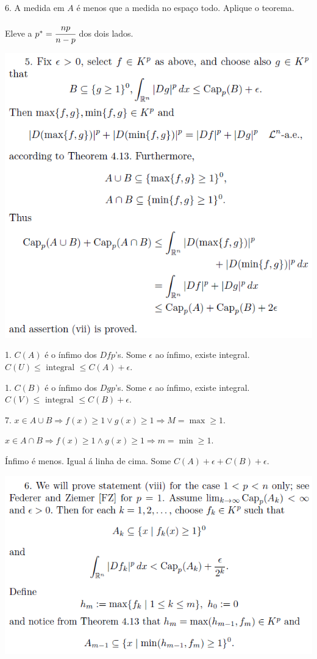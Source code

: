 \documentclass[12pt]{article}
\begin{document}
6. A medida em $A$ \'e menos que a medida no espa\c{c}o todo. Aplique o teorema.

Eleve a $p^* = \cfrac{np}{n - p}$ dos dois lados.

\vspace{300mm}

		\begin{center}
		\includegraphics[scale=.9]{13}
		\end{center}

1. $C(A)$ \'e o \'infimo dos $Dfp$'s. Some $\epsilon$ ao \'infimo, existe integral. $C(U) \le \text{ integral }\le C(A) + \epsilon$.

1. $C(B)$ \'e o \'infimo dos $Dgp$'s. Some $\epsilon$ ao \'infimo, existe integral. $C(V) \le \text{ integral }\le C(B) + \epsilon$.

7. $x \in A \cup B \Rightarrow f(x) \ge 1 \vee g(x) \ge 1 \Rightarrow M = \max \ge 1$.

$x \in A \cap B \Rightarrow f(x) \ge 1 \wedge g(x) \ge 1 \Rightarrow m = \min \ge 1$.

\'Infimo \'e menos. Igual \'a linha de cima. Some $C(A) + \epsilon + C(B) + \epsilon$.

\vspace{300mm}

		\begin{center}
		\includegraphics{14}
		\end{center}
\end{document}
